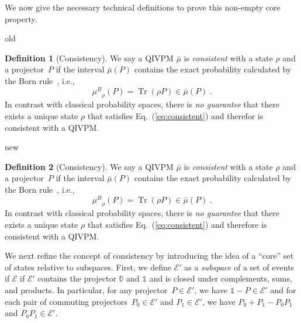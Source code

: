 \documentclass[english,reprint, aps, prl,superscriptaddress, showpacs,
showkeys, longbibliography, amsmath, amssymb, floatfix]{revtex4-1}
\theoremstyle{plain}
\theoremstyle{definition}
\newtheorem{definition}{Definition}
\newcommand{\events}{\ensuremath{\mathcal{E}}}
\newcommand{\Tr}{\ensuremath{\mathop{\mathrm{Tr}}\nolimits}}
\newcommand{\muB}{\ensuremath{\mu^{B}}}
\newcommand{\says}[3]{\begin{framed}\begin{minipage}{0.9\linewidth}\color{#1}{#2 says: #3}\end{minipage}\end{framed}}
\newcommand{\gerardo}[1]{\says{OliveGreen}{Gerardo}{#1}}
\newenvironment{compare}{\begin{widetext}\end{widetext}}{\begin{widetext}\end{widetext}}
\newenvironment{oldText}[1]{\begin{compareText}{#1}{old}}{\end{compareText}\newpage}
\newenvironment{newText}[1]{\begin{compareText}{#1}{new}}{\end{compareText}}
\begin{document}
We now give the necessary technical definitions to prove this
non-empty core property.
\begin{compare}
\begin{oldText}{\gerardo}
\begin{definition}[Consistency] We say a QIVPM $\bar{\mu}$ is
\emph{consistent} with a state $\rho$ and a projector~$P$ if the
interval $\bar{\mu}(P)$ contains the exact probability calculated by
the Born rule~\cite{Born1983bibTeX,Mermin2007,Jaeger2007}, i.e.,
  \begin{equation}
  \muB_{\rho}\left(P\right) = \Tr\left(\rho
  P\right)\in\bar{\mu}\left(P\right)\ .\label{eq:consistent}
  \end{equation}
In contrast with classical probability spaces, there is \emph{no
guarantee} that there exists a unique state $\rho$ that satisfies
Eq.~(\ref{eq:consistent}) and therefor is consistent with a QIVPM.
\end{definition}
\end{oldText}
\begin{newText}{\gerardo}
\begin{definition}[Consistency] We say a QIVPM $\bar{\mu}$ is
\emph{consistent} with a state $\rho$ and a projector~$P$ if the
interval $\bar{\mu}(P)$ contains the exact probability calculated by
the Born rule~\cite{Born1983bibTeX,Mermin2007,Jaeger2007}, i.e.,
  \begin{equation}
  \muB_{\rho}\left(P\right) = \Tr\left(\rho
  P\right)\in\bar{\mu}\left(P\right)\ .\label{eq:consistent}
  \end{equation}
In contrast with classical probability spaces, there is \emph{no
guarantee} that there exists a unique state $\rho$ that satisfies
Eq.~(\ref{eq:consistent}) and therefor{\color{OliveGreen}e} is consistent with a QIVPM.
\end{definition}
\end{newText}
\end{compare}

We next refine the concept of consistency by introducing the idea of
a ``core'' set of states relative to subspaces. First, we define
$\events'$ as a \emph{subspace} of a set of events if $\events$ if
$\events'$ contains the projector $\mathbb{0}$ and $\mathbb{1}$ and is closed under
complements, sums, and products.  In particular, for any
projector~$P\in\events'$, we have
$\mathbb{1}-P\in\events'$ and for each pair of commuting
projectors~$P_{0}\in\events'$ and $P_{1}\in\events'$, we have
$P_{0}+P_{1}-P_{0}P_{1}$ and $P_{0}P_{1}\in\events'$.
\end{document}
